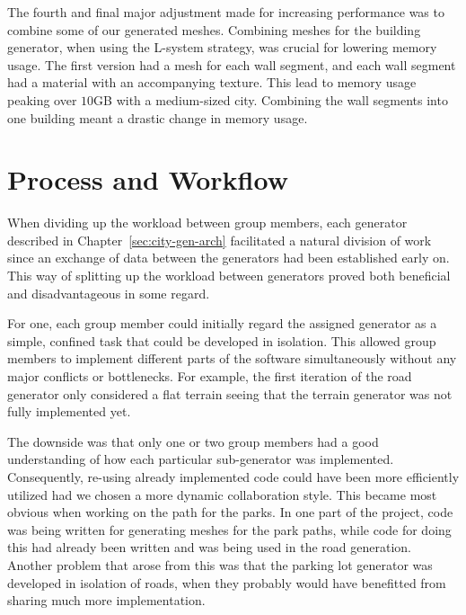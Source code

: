 The fourth and final major adjustment made for increasing performance was to combine some of our generated meshes. 
Combining meshes for the building generator, when using the L-system strategy, was crucial for lowering memory usage. 
The first version had a mesh for each wall segment, and each wall segment had a material with an accompanying texture. 
This lead to memory usage peaking over $10$GB with a medium-sized city. 
Combining the wall segments into one building meant a drastic change in memory usage. 

\section{Process and Workflow}
When dividing up the workload between group members, each generator described in Chapter~\ref{sec:city-gen-arch} facilitated a natural division of work since an exchange of data between the generators had been established early on.
This way of splitting up the workload between generators proved both beneficial and disadvantageous in some regard.

For one, each group member could initially regard the assigned generator as a simple, confined task that could be developed in isolation.
This allowed group members to implement different parts of the software simultaneously without any major conflicts or bottlenecks.
For example, the first iteration of the road generator only considered a flat terrain seeing that the terrain generator was not fully implemented yet.

The downside was that only one or two group members had a good understanding of how each particular sub-generator was implemented.
Consequently, re-using already implemented code could have been more efficiently utilized had we chosen a more dynamic collaboration style.
This became most obvious when working on the path for the parks.
In one part of the project, code was being written for generating meshes for the park paths, while code for doing this had already been written and was being used in the road generation.
Another problem that arose from this was that the parking lot generator was developed in isolation of roads, when they probably would have benefitted from sharing much more implementation.

\newpage